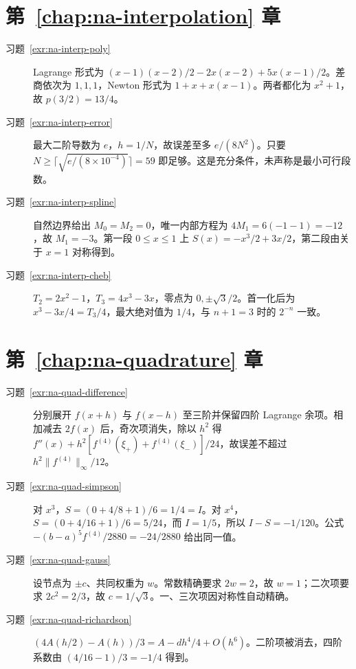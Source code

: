 \section{第~\ref{chap:na-interpolation} 章}
\begin{description}
\item[习题~\ref{exr:na-interp-poly}] Lagrange 形式为 $(x-1)(x-2)/2-2x(x-2)+5x(x-1)/2$。差商依次为 $1,1,1$，Newton 形式为 $1+x+x(x-1)$。两者都化为 $x^2+1$，故 $p(3/2)=13/4$。
\item[习题~\ref{exr:na-interp-error}] 最大二阶导数为 $e$，$h=1/N$，故误差至多 $e/(8N^2)$。只要 $N\ge\lceil\sqrt{e/(8\times10^{-4})}\rceil=59$ 即足够。这是充分条件，未声称是最小可行段数。
\item[习题~\ref{exr:na-interp-spline}] 自然边界给出 $M_0=M_2=0$，唯一内部方程为 $4M_1=6(-1-1)=-12$，故 $M_1=-3$。第一段 $0\le x\le1$ 上 $S(x)=-x^3/2+3x/2$，第二段由关于 $x=1$ 对称得到。
\item[习题~\ref{exr:na-interp-cheb}] $T_2=2x^2-1$，$T_3=4x^3-3x$，零点为 $0,\pm\sqrt3/2$。首一化后为 $x^3-3x/4=T_3/4$，最大绝对值为 $1/4$，与 $n+1=3$ 时的 $2^{-n}$ 一致。
\end{description}

\section{第~\ref{chap:na-quadrature} 章}
\begin{description}
\item[习题~\ref{exr:na-quad-difference}] 分别展开 $f(x+h)$ 与 $f(x-h)$ 至三阶并保留四阶 Lagrange 余项。相加减去 $2f(x)$ 后，奇次项消失，除以 $h^2$ 得 $f''(x)+h^2[f^{(4)}(\xi_+)+f^{(4)}(\xi_-)]/24$，故误差不超过 $h^2\|f^{(4)}\|_\infty/12$。
\item[习题~\ref{exr:na-quad-simpson}] 对 $x^3$，$S=(0+4/8+1)/6=1/4=I$。对 $x^4$，$S=(0+4/16+1)/6=5/24$，而 $I=1/5$，所以 $I-S=-1/120$。公式 $-(b-a)^5f^{(4)}/2880=-24/2880$ 给出同一值。
\item[习题~\ref{exr:na-quad-gauss}] 设节点为 $\pm c$、共同权重为 $w$。常数精确要求 $2w=2$，故 $w=1$；二次项要求 $2c^2=2/3$，故 $c=1/\sqrt3$。一、三次项因对称性自动精确。
\item[习题~\ref{exr:na-quad-richardson}] $(4A(h/2)-A(h))/3=A-dh^4/4+O(h^6)$。二阶项被消去，四阶系数由 $(4/16-1)/3=-1/4$ 得到。
\end{description}

